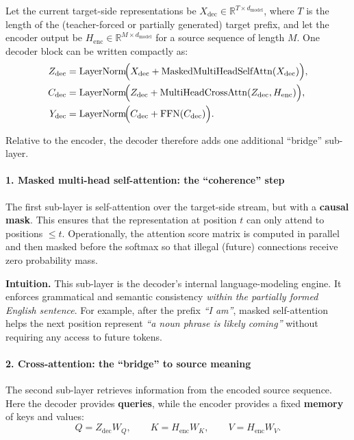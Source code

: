\noindent
Let the current target-side representations be
\(
X_{\text{dec}} \in \mathbb{R}^{T \times d_{\text{model}}}
\),
where \(T\) is the length of the (teacher-forced or partially generated) target prefix,
and let the encoder output be
\(
H_{\text{enc}} \in \mathbb{R}^{M \times d_{\text{model}}}
\)
for a source sequence of length \(M\).
One decoder block can be written compactly as:
\begin{align}
	Z_{\text{dec}} 
	&= 
	\text{LayerNorm}\!\Bigl(
	X_{\text{dec}} 
	+ 
	\text{MaskedMultiHeadSelfAttn}(X_{\text{dec}})
	\Bigr), \\
	C_{\text{dec}}
	&=
	\text{LayerNorm}\!\Bigl(
	Z_{\text{dec}}
	+
	\text{MultiHeadCrossAttn}(Z_{\text{dec}}, H_{\text{enc}})
	\Bigr), \\
	Y_{\text{dec}}
	&=
	\text{LayerNorm}\!\Bigl(
	C_{\text{dec}}
	+
	\text{FFN}(C_{\text{dec}})
	\Bigr).
\end{align}

\noindent
Relative to the encoder, the decoder therefore adds one additional ``bridge'' sub-layer.

\paragraph{1. Masked multi-head self-attention: the ``coherence'' step}
\noindent
The first sub-layer is self-attention over the target-side stream, but with a \textbf{causal mask}.
This ensures that the representation at position \(t\) can only attend to positions \(\le t\).
Operationally, the attention score matrix is computed in parallel and then masked
before the softmax so that illegal (future) connections receive zero probability mass.

\noindent
\textbf{Intuition.}
This sub-layer is the decoder's internal language-modeling engine.
It enforces grammatical and semantic consistency \emph{within the partially formed English sentence}.
For example, after the prefix \emph{``I am''},
masked self-attention helps the next position represent
\emph{``a noun phrase is likely coming''}
without requiring any access to future tokens.

\paragraph{2. Cross-attention: the ``bridge'' to source meaning}
\noindent
The second sub-layer retrieves information from the encoded source sequence.
Here the decoder provides \textbf{queries},
while the encoder provides a fixed \textbf{memory} of keys and values:
\[
Q = Z_{\text{dec}} W_Q,
\qquad
K = H_{\text{enc}} W_K,
\qquad
V = H_{\text{enc}} W_V.
\]

